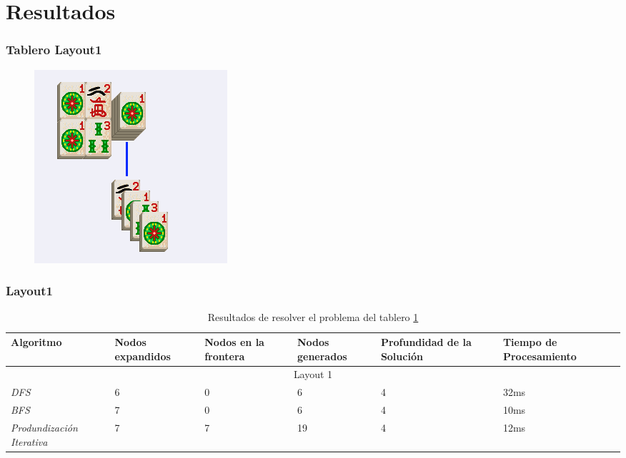 \documentclass{beamer}
\begin{document}
\section{Resultados}

\begin{frame}
\frametitle{Tablero Layout1}
\begin{figure}[hb]
	\includegraphics[scale=0.3]{../Boards/Layout1.png}
	 \label{fig:layout1}
\end{figure}
\end{frame}

\begin{frame}
\frametitle{Layout1}

\tiny{
\begin{table}[h]
\begin{center}
	\begin{tabular}{|p{1.3cm}|p{1cm}|p{1cm}|p{1cm}|p{2cm}|p{2cm}|}
	\hline
	 Algoritmo & Nodos expandidos & Nodos en la frontera & Nodos generados & Profundidad de la Soluci\'on & Tiempo de Procesamiento\\
	\hline \hline
		 \multicolumn{6}{|c|}{Layout 1} \\
	\hline
	\textit{DFS} & 6 & 0 & 6 & 4 & 32ms \\
	\textit{BFS} & 7 & 0 & 6 & 4 & 10ms \\
	\textit{Produndizaci\'on Iterativa} & 7 & 7 & 19 & 4 & 12ms \\
	\hline
	\end{tabular}
\end{center}
\caption{Resultados de resolver el problema del tablero \ref{fig:layout1}}
\label{tab:costLayout1}
\end{table}}

\end{frame}
\end{document}
